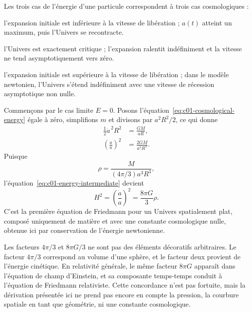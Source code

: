 Les trois cas de l’énergie d’une particule correspondent à trois cas cosmologiques :
\begin{description}[style=nextline]
\item[\(E<0\) :] l’expansion initiale est inférieure à la vitesse de libération ; \(a(t)\) atteint un maximum, puis l’Univers se recontracte.
\item[\(E=0\) :] l’Univers est exactement critique ; l’expansion ralentit indéfiniment et la vitesse ne tend asymptotiquement vers zéro.
\item[\(E>0\) :] l’expansion initiale est supérieure à la vitesse de libération ; dans le modèle newtonien, l’Univers s’étend indéfiniment avec une vitesse de récession asymptotique non nulle.
\end{description}

Commençons par le cas limite \(E=0\). Posons l’équation~\eqref{eq:c01-cosmological-energy} égale à zéro, simplifions \(m\) et divisons par \(a^2R^2/2\), ce qui donne
\begin{align}
\frac12\dot a^{\,2}R^2&=\frac{GM}{aR}, \\
\left(\frac{\dot a}{a}\right)^2&=\frac{2GM}{a^3R^3}.
\label{eq:c01-energy-intermediate}
\end{align}
Puisque
\begin{equation}
\rho=\frac{M}{(4\pi/3)a^3R^3},
\end{equation}
l’équation~\eqref{eq:c01-energy-intermediate} devient
\begin{equation}
\boxed{
H^2=\left(\frac{\dot a}{a}\right)^2=\frac{8\pi G}{3}\rho.
}
\label{eq:c01-first-friedmann}
\end{equation}
C’est la première équation de Friedmann pour un Univers spatialement plat, composé uniquement de matière et avec une constante cosmologique nulle, obtenue ici par conservation de l’énergie newtonienne.

\begin{classroomqa}
\end{classroomqa}

Les facteurs \(4\pi/3\) et \(8\pi G/3\) ne sont pas des éléments décoratifs arbitraires. Le facteur \(4\pi/3\) correspond au volume d’une sphère, et le facteur deux provient de l’énergie cinétique. En relativité générale, le même facteur \(8\pi G\) apparaît dans l’équation de champ d’Einstein, et sa composante temps-temps conduit à l’équation de Friedmann relativiste. Cette concordance n’est pas fortuite, mais la dérivation présentée ici ne prend pas encore en compte la pression, la courbure spatiale en tant que géométrie, ni une constante cosmologique.

